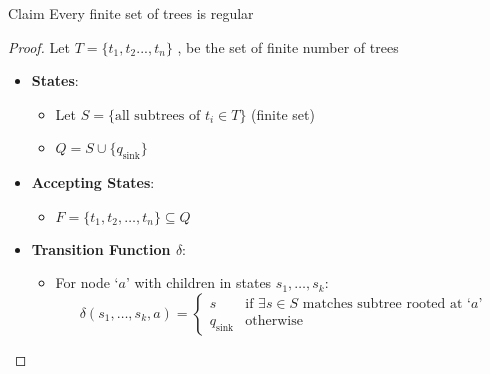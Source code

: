 \documentclass[10pt,svgnames,fragile]{beamer}
\begin{document}
\begin{frame}
    \begin{block}{Claim} Every finite set of trees is regular \end{block}
    \pause
    \begin{proof}
        Let $T = \{t_1,t_2...,t_n\}$ , be the set of finite number of trees \vspace{7pt}
        \begin{itemize}
        \begin{itemize}
            \item \textbf{States}: 
            \begin{itemize}
                \item Let $S = \{\text{all subtrees of } t_i \in T\}$ (finite set)
                \item $Q = S \cup \{q_{\text{sink}}\}$
            \end{itemize}
            
            \item \textbf{Accepting States}:
            \begin{itemize}
                \item $F = \{t_1, t_2, \ldots, t_n\} \subseteq Q$
            \end{itemize}
    
            
            \item \textbf{Transition Function $\delta$}:
            \begin{itemize}
                \item For node `$a$' with children in states $s_1, \ldots, s_k$:
                \[
                \delta( s_1, \ldots, s_k, a) = 
                \begin{cases}
                    s & \text{if } \exists s \in S \text{ matches subtree rooted at } \text{`}a\text{'} \\
                    q_{\text{sink}} & \text{otherwise}
                \end{cases}
                \]
            \end{itemize}
        \end{itemize}
    \end{itemize}
    \end{proof}
\end{frame}
\end{document}
